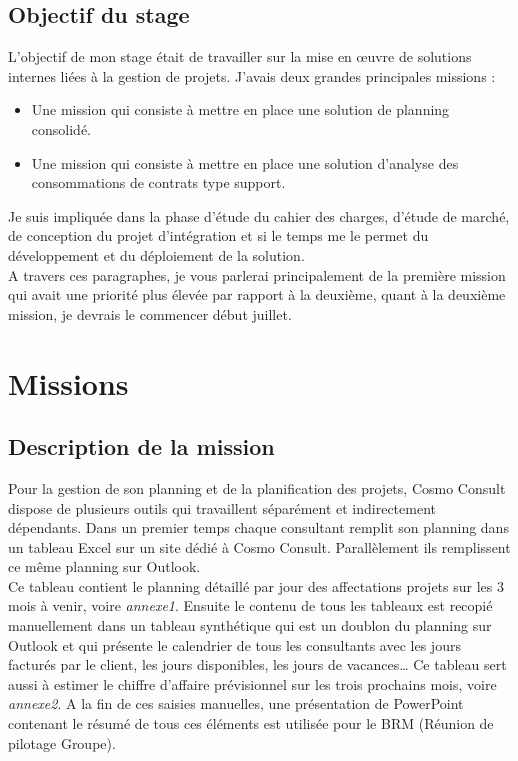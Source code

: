 \documentclass[11pt]{report}
\begin{document}
	\subsection{Objectif du stage}
\hspace{1cm} L’objectif de mon stage était de travailler sur la mise en œuvre de solutions internes liées à la gestion de projets. J’avais deux grandes principales missions :
\begin{itemize}
	\item Une mission qui consiste à mettre en place une solution de planning consolidé.
	
	\item Une mission qui consiste à mettre en place une solution d’analyse des consommations de contrats type support.
\end{itemize}

\hspace{1cm} Je suis impliquée dans la phase d’étude du cahier des charges, d’étude de marché, de conception du projet d’intégration et si le temps me le permet du développement et du déploiement de la solution.\\

\hspace{1cm} A travers ces paragraphes, je vous parlerai principalement de la première mission qui avait une priorité plus élevée par rapport à la deuxième, quant à la deuxième mission, je devrais le commencer début juillet.

 \newpage
\section{Missions}
	\subsection{Description de la mission}
\hspace{1cm} Pour la gestion de son planning et de la planification des projets, Cosmo Consult dispose de plusieurs outils qui travaillent séparément et indirectement dépendants.
Dans un premier temps chaque consultant remplit son planning dans un tableau Excel sur un site dédié à Cosmo Consult. Parallèlement ils remplissent ce même planning sur Outlook.\\

\hspace{1cm} Ce tableau contient le planning détaillé par jour des affectations projets sur les 3 mois à venir, voire \textit{annexe1}. Ensuite le contenu de tous les tableaux est recopié manuellement dans un tableau synthétique qui est un doublon du planning sur Outlook et qui présente le calendrier de tous les consultants avec les jours facturés par le client, les jours disponibles, les jours de vacances… Ce tableau sert aussi à estimer le chiffre d’affaire prévisionnel sur les trois prochains mois, voire \textit{annexe2}.
A la fin de ces saisies manuelles, une présentation de PowerPoint contenant le résumé de tous ces éléments est utilisée pour le BRM (Réunion de pilotage Groupe).\\
\end{document}

